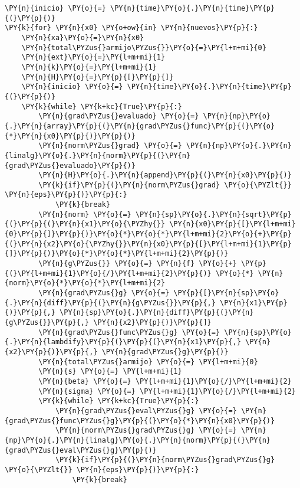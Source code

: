\begin{itemize}
\begin{tcolorbox}[breakable, size=fbox, boxrule=1pt, pad at break*=1mm,colback=cellbackground, colframe=cellborder]
\begin{Verbatim}[commandchars=\\\{\}]
\PY{n}{inicio} \PY{o}{=} \PY{n}{time}\PY{o}{.}\PY{n}{time}\PY{p}{(}\PY{p}{)}
\PY{k}{for} \PY{n}{x0} \PY{o+ow}{in} \PY{n}{nuevos}\PY{p}{:}
    \PY{n}{xa}\PY{o}{=}\PY{n}{x0}
    \PY{n}{total\PYZus{}armijo\PYZus{}}\PY{o}{=}\PY{l+m+mi}{0}
    \PY{n}{ext}\PY{o}{=}\PY{l+m+mi}{1}
    \PY{n}{k}\PY{o}{=}\PY{l+m+mi}{1}
    \PY{n}{H}\PY{o}{=}\PY{p}{[}\PY{p}{]}
    \PY{n}{inicio} \PY{o}{=} \PY{n}{time}\PY{o}{.}\PY{n}{time}\PY{p}{(}\PY{p}{)}
    \PY{k}{while} \PY{k+kc}{True}\PY{p}{:}
        \PY{n}{grad\PYZus{}evaluado} \PY{o}{=} \PY{n}{np}\PY{o}{.}\PY{n}{array}\PY{p}{(}\PY{n}{grad\PYZus{}func}\PY{p}{(}\PY{o}{*}\PY{n}{x0}\PY{p}{)}\PY{p}{)}
        \PY{n}{norm\PYZus{}grad} \PY{o}{=} \PY{n}{np}\PY{o}{.}\PY{n}{linalg}\PY{o}{.}\PY{n}{norm}\PY{p}{(}\PY{n}{grad\PYZus{}evaluado}\PY{p}{)}
        \PY{n}{H}\PY{o}{.}\PY{n}{append}\PY{p}{(}\PY{n}{x0}\PY{p}{)}
        \PY{k}{if}\PY{p}{(}\PY{n}{norm\PYZus{}grad} \PY{o}{\PYZlt{}} \PY{n}{eps}\PY{p}{)}\PY{p}{:}
            \PY{k}{break}
        \PY{n}{norm} \PY{o}{=} \PY{n}{sp}\PY{o}{.}\PY{n}{sqrt}\PY{p}{(}\PY{p}{(}\PY{n}{x1}\PY{o}{\PYZhy{}} \PY{n}{x0}\PY{p}{[}\PY{l+m+mi}{0}\PY{p}{]}\PY{p}{)}\PY{o}{*}\PY{o}{*}\PY{l+m+mi}{2}\PY{o}{+}\PY{p}{(}\PY{n}{x2}\PY{o}{\PYZhy{}}\PY{n}{x0}\PY{p}{[}\PY{l+m+mi}{1}\PY{p}{]}\PY{p}{)}\PY{o}{*}\PY{o}{*}\PY{l+m+mi}{2}\PY{p}{)}
        \PY{n}{g\PYZus{}} \PY{o}{=} \PY{n}{f} \PY{o}{+} \PY{p}{(}\PY{l+m+mi}{1}\PY{o}{/}\PY{l+m+mi}{2}\PY{p}{)} \PY{o}{*} \PY{n}{norm}\PY{o}{*}\PY{o}{*}\PY{l+m+mi}{2}
        \PY{n}{grad\PYZus{}g} \PY{o}{=} \PY{p}{[}\PY{n}{sp}\PY{o}{.}\PY{n}{diff}\PY{p}{(}\PY{n}{g\PYZus{}}\PY{p}{,} \PY{n}{x1}\PY{p}{)}\PY{p}{,} \PY{n}{sp}\PY{o}{.}\PY{n}{diff}\PY{p}{(}\PY{n}{g\PYZus{}}\PY{p}{,} \PY{n}{x2}\PY{p}{)}\PY{p}{]}
        \PY{n}{grad\PYZus{}func\PYZus{}g} \PY{o}{=} \PY{n}{sp}\PY{o}{.}\PY{n}{lambdify}\PY{p}{(}\PY{p}{(}\PY{n}{x1}\PY{p}{,} \PY{n}{x2}\PY{p}{)}\PY{p}{,} \PY{n}{grad\PYZus{}g}\PY{p}{)}
        \PY{n}{total\PYZus{}armijo} \PY{o}{=} \PY{l+m+mi}{0}    
        \PY{n}{s} \PY{o}{=} \PY{l+m+mi}{1}
        \PY{n}{beta} \PY{o}{=} \PY{l+m+mi}{1}\PY{o}{/}\PY{l+m+mi}{2}
        \PY{n}{sigma} \PY{o}{=} \PY{l+m+mi}{1}\PY{o}{/}\PY{l+m+mi}{2}
        \PY{k}{while} \PY{k+kc}{True}\PY{p}{:}
            \PY{n}{grad\PYZus{}eval\PYZus{}g} \PY{o}{=} \PY{n}{grad\PYZus{}func\PYZus{}g}\PY{p}{(}\PY{o}{*}\PY{n}{x0}\PY{p}{)}
            \PY{n}{norm\PYZus{}grad\PYZus{}g} \PY{o}{=} \PY{n}{np}\PY{o}{.}\PY{n}{linalg}\PY{o}{.}\PY{n}{norm}\PY{p}{(}\PY{n}{grad\PYZus{}eval\PYZus{}g}\PY{p}{)}
            \PY{k}{if}\PY{p}{(}\PY{n}{norm\PYZus{}grad\PYZus{}g} \PY{o}{\PYZlt{}} \PY{n}{eps}\PY{p}{)}\PY{p}{:}
                \PY{k}{break}

\end{Verbatim}
\end{tcolorbox}
\end{itemize}
